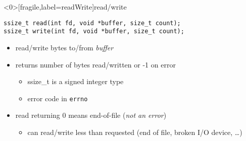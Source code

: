 \begin{frame}<0>[fragile,label=readWrite]{read/write}
\begin{lstlisting}
ssize_t read(int fd, void *buffer, size_t count);
ssize_t write(int fd, void *buffer, size_t count);
\end{lstlisting}
\begin{itemize}
\item read/write  bytes to/from \textit{buffer}
\item returns number of bytes read/written or -1 on error
    \begin{itemize}
    \item ssize\_t is a signed integer type
    \item error code in \texttt{errno}
    \end{itemize}
\item read returning 0 means end-of-file (\textit{not an error})
\begin{itemize}
\item can read/write less than requested (end of file, broken I/O device, \ldots)
\end{itemize}
\end{itemize}
\end{frame}
